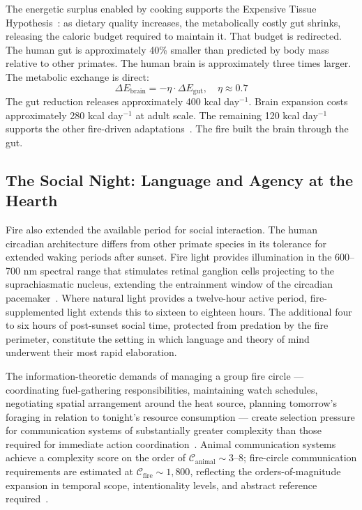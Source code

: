 The energetic surplus enabled by cooking supports the Expensive Tissue Hypothesis~\cite{wrangham1999}: as dietary quality increases, the metabolically costly gut shrinks, releasing the caloric budget required to maintain it. That budget is redirected. The human gut is approximately 40\% smaller than predicted by body mass relative to other primates. The human brain is approximately three times larger. The metabolic exchange is direct:
%
\begin{equation}
\Delta E_{\mathrm{brain}} = -\eta \cdot \Delta E_{\mathrm{gut}}, \quad \eta \approx 0.7
\end{equation}
%
The gut reduction releases approximately 400 kcal day$^{-1}$. Brain expansion costs approximately 280 kcal day$^{-1}$ at adult scale. The remaining 120 kcal day$^{-1}$ supports the other fire-driven adaptations~\cite{author_fire_catalyst}. The fire built the brain through the gut.

\subsection{The Social Night: Language and Agency at the Hearth}

Fire also extended the available period for social interaction. The human circadian architecture differs from other primate species in its tolerance for extended waking periods after sunset. Fire light provides illumination in the 600--700 nm spectral range that stimulates retinal ganglion cells projecting to the suprachiasmatic nucleus, extending the entrainment window of the circadian pacemaker~\cite{author_fire_catalyst}. Where natural light provides a twelve-hour active period, fire-supplemented light extends this to sixteen to eighteen hours. The additional four to six hours of post-sunset social time, protected from predation by the fire perimeter, constitute the setting in which language and theory of mind underwent their most rapid elaboration.

The information-theoretic demands of managing a group fire circle --- coordinating fuel-gathering responsibilities, maintaining watch schedules, negotiating spatial arrangement around the heat source, planning tomorrow's foraging in relation to tonight's resource consumption --- create selection pressure for communication systems of substantially greater complexity than those required for immediate action coordination~\cite{author_language}. Animal communication systems achieve a complexity score on the order of $\mathcal{C}_{\mathrm{animal}} \sim 3$--$8$; fire-circle communication requirements are estimated at $\mathcal{C}_{\mathrm{fire}} \sim 1{,}800$, reflecting the orders-of-magnitude expansion in temporal scope, intentionality levels, and abstract reference required~\cite{author_language}.

